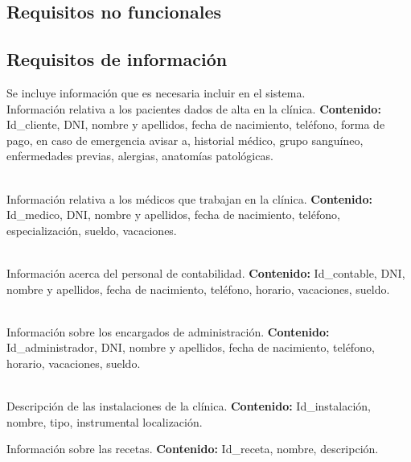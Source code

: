 \documentclass[11pt,a4paper]{article}
\begin{document}
    \subsection{Requisitos no funcionales}


  \subsection{Requisitos de información}

  Se incluye información que es necesaria incluir en el sistema.
  \\
  Información relativa a los pacientes dados de alta en la clínica.
  \textbf{Contenido:} Id\_cliente, DNI, nombre y apellidos, fecha de nacimiento, teléfono, forma de pago, en caso de emergencia avisar a, historial médico, grupo sanguíneo, enfermedades previas, alergias, anatomías patológicas.
  
  \\
  Información relativa a los médicos que trabajan en la clínica.
  \textbf{Contenido:} Id\_medico, DNI, nombre y apellidos, fecha de nacimiento, teléfono, especialización, sueldo, vacaciones.
  
  \\
  Información acerca del personal de contabilidad.
  \textbf{Contenido:} Id\_contable, DNI, nombre y apellidos, fecha de nacimiento, teléfono, horario, vacaciones, sueldo.

  \\
  Información sobre los encargados de administración.
  \textbf{Contenido:} Id\_administrador, DNI, nombre y apellidos, fecha de nacimiento, teléfono, horario, vacaciones, sueldo.
  
  \\
  Descripción de las instalaciones de la clínica.
  \textbf{Contenido:} Id\_instalación, nombre, tipo, instrumental localización.
  
  Información sobre las recetas.
  \textbf{Contenido:} Id_receta, nombre, descripción.
\end{document}
